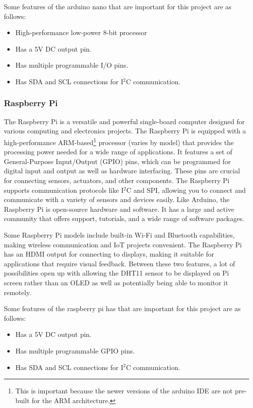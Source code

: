 \documentclass{article}
\begin{document}
\begin{multicols}{2}
			Some features of the arduino nano that are important for this project are as follows:
			\begin{itemize}[itemsep=1pt, parsep=1pt]
				\item High-performance low-power 8-bit processor
				\item Has a 5V DC output pin.
				\item Has multiple programmable I/O pins.
				\item Has SDA and SCL connections for I$^2$C communication.
			\end{itemize}
		
			\subsubsection{Raspberry Pi}
			
			The Raspberry Pi is a versatile and powerful single-board computer designed for various computing and electronics projects. The Raspberry Pi is equipped with a high-performance ARM-based\footnote{This is important because the newer versions of the arduino IDE are not pre-built for the ARM architecture.} processor (varies by model) that provides the processing power needed for a wide range of applications. It features a set of General-Purpose Input/Output (GPIO) pins, which can be programmed for digital input and output as well as hardware interfacing. These pins are crucial for connecting sensors, actuators, and other components. The Raspberry Pi supports communication protocols like I$^2$C and SPI, allowing you to connect and communicate with a variety of sensors and devices easily. Like Arduino, the Raspberry Pi is open-source hardware and software. It has a large and active community that offers support, tutorials, and a wide range of software packages.
			
			Some Raspberry Pi models include built-in Wi-Fi and Bluetooth capabilities, making wireless communication and IoT projects convenient. The Raspberry Pi has an HDMI output for connecting to displays, making it suitable for applications that require visual feedback. Between these two features, a lot of possibilities open up with allowing the DHT11 sensor to be displayed on Pi screen rather than an OLED as well as potentially being able to monitor it remotely.
			
			Some features of the raspberry pi has that are important for this project are as follows:
			\begin{itemize}[itemsep=1pt, parsep=1pt]
				\item Has a 5V DC output pin.
				\item Has multiple programmable GPIO pins.
				\item Has SDA and SCL connections for I$^2$C communication.
			\end{itemize}
		

\end{multicols}
\end{document}
